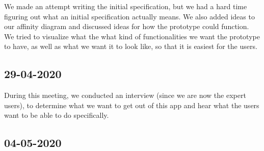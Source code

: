 \documentclass{article}
\begin{document}
We made an attempt writing the initial specification, but we had a hard time figuring out what an initial specification actually means. We also added ideas to our affinity diagram and discussed ideas for how the prototype could function. We tried to visualize what the what kind of functionalities we want the prototype to have, as well as what we want it to look like, so that it is easiest for the users.

\subsection*{29-04-2020}
During this meeting, we conducted an interview (since we are now the expert users), to determine what we want to get out of this app and hear what the users want to be able to do specifically.

\subsection*{04-05-2020}
\end{document}
